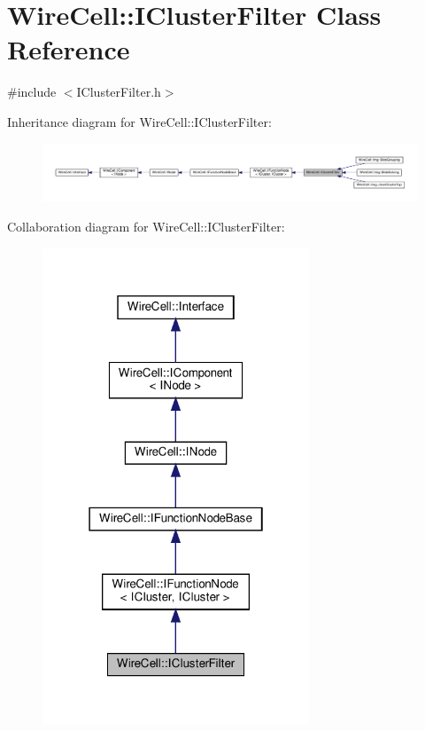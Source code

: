 \hypertarget{class_wire_cell_1_1_i_cluster_filter}{}\section{Wire\+Cell\+:\+:I\+Cluster\+Filter Class Reference}
\label{class_wire_cell_1_1_i_cluster_filter}


{\ttfamily \#include $<$I\+Cluster\+Filter.\+h$>$}



Inheritance diagram for Wire\+Cell\+:\+:I\+Cluster\+Filter\+:
\nopagebreak
\begin{figure}[H]
\begin{center}
\leavevmode
\includegraphics[width=350pt]{class_wire_cell_1_1_i_cluster_filter__inherit__graph}
\end{center}
\end{figure}


Collaboration diagram for Wire\+Cell\+:\+:I\+Cluster\+Filter\+:
\nopagebreak
\begin{figure}[H]
\begin{center}
\leavevmode
\includegraphics[width=226pt]{class_wire_cell_1_1_i_cluster_filter__coll__graph}
\end{center}
\end{figure}
